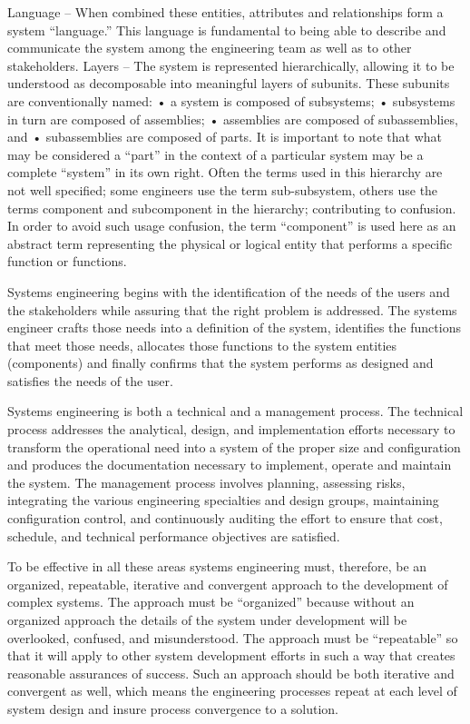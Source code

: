 Language – When combined these entities, attributes and relationships form a system “language.” This language is fundamental to being able to describe and communicate the system among the engineering team as well as to other stakeholders.
Layers – The system is represented hierarchically, allowing it to be understood as decomposable into meaningful layers of subunits. These subunits are conventionally named: 
    • a system is composed of subsystems; 
    • subsystems in turn are composed of assemblies; 
    • assemblies are composed of subassemblies, and 
    • subassemblies are composed of parts. 
It is important to note that what may be considered a ``part'' in the context of a particular system may be a complete ``system'' in its own right.
Often the terms used in this hierarchy are not well specified; some engineers use the term sub-subsystem, others use the terms component and subcomponent in the hierarchy; contributing to confusion. In order to avoid such usage confusion, the term ``component'' is used here as an abstract term representing the physical or logical entity that performs a specific function or functions.

Systems engineering begins with the identification of the needs of the users and the stakeholders while assuring that the right problem is addressed. The systems engineer crafts those needs into a definition of the system, identifies the functions that meet those needs, allocates those functions to the system entities (components) and finally confirms that the system performs as designed and satisfies the needs of the user.

Systems engineering is both a technical and a management process. The technical process addresses the analytical, design, and implementation efforts necessary to transform the operational need into a system of the proper size and configuration and produces the documentation necessary to implement, operate and maintain the system. The management process involves planning, assessing risks, integrating the various engineering specialties and design groups, maintaining configuration control, and continuously auditing the effort to ensure that cost, schedule, and technical performance objectives are satisfied.

To be effective in all these areas systems engineering must, therefore, be an organized, repeatable, iterative and convergent approach to the development of complex systems. The approach must be ``organized'' because without an organized approach the details of the system under development will be overlooked, confused, and misunderstood. The approach must be “repeatable” so that it will apply to other system development efforts in such a way that creates reasonable assurances of success. Such an approach should be both iterative and convergent as well, which means the engineering processes repeat at each level of system design and insure process convergence to a solution.

